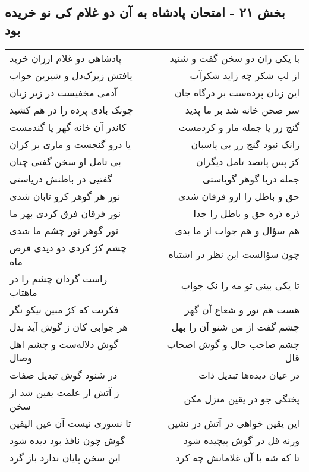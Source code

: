 \begin{center}
\section*{بخش ۲۱ - امتحان پادشاه به آن دو غلام کی نو خریده بود}
\label{sec:sh021}
\begin{longtable}{l p{0.5cm} r}
پادشاهی دو غلام ارزان خرید
&&
با یکی زان دو سخن گفت و شنید
\\
یافتش زیرک‌دل و شیرین جواب
&&
از لب شکر چه زاید شکرآب
\\
آدمی مخفیست در زیر زبان
&&
این زبان پرده‌ست بر درگاه جان
\\
چونک بادی پرده را در هم کشید
&&
سر صحن خانه شد بر ما پدید
\\
کاندر آن خانه گهر یا گندمست
&&
گنج زر یا جمله مار و کزدمست
\\
یا درو گنجست و ماری بر کران
&&
زانک نبود گنج زر بی پاسبان
\\
بی تامل او سخن گفتی چنان
&&
کز پس پانصد تامل دیگران
\\
گفتیی در باطنش دریاستی
&&
جمله دریا گوهر گویاستی
\\
نور هر گوهر کزو تابان شدی
&&
حق و باطل را ازو فرقان شدی
\\
نور فرقان فرق کردی بهر ما
&&
ذره ذره حق و باطل را جدا
\\
نور گوهر نور چشم ما شدی
&&
هم سؤال و هم جواب از ما بدی
\\
چشم کژ کردی دو دیدی قرص ماه
&&
چون سؤالست این نظر در اشتباه
\\
راست گردان چشم را در ماهتاب
&&
تا یکی بینی تو مه را نک جواب
\\
فکرتت که کژ مبین نیکو نگر
&&
هست هم نور و شعاع آن گهر
\\
هر جوابی کان ز گوش آید بدل
&&
چشم گفت از من شنو آن را بهل
\\
گوش دلاله‌ست و چشم اهل وصال
&&
چشم صاحب حال و گوش اصحاب قال
\\
در شنود گوش تبدیل صفات
&&
در عیان دیده‌ها تبدیل ذات
\\
ز آتش ار علمت یقین شد از سخن
&&
پختگی جو در یقین منزل مکن
\\
تا نسوزی نیست آن عین الیقین
&&
این یقین خواهی در آتش در نشین
\\
گوش چون نافذ بود دیده شود
&&
ورنه قل در گوش پیچیده شود
\\
این سخن پایان ندارد باز گرد
&&
تا که شه با آن غلامانش چه کرد
\\
\end{longtable}
\end{center}
